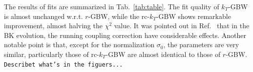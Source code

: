 \documentclass[11pt]{article}
\numberwithin{equation}{section}
\numberwithin{table}{section}
\numberwithin{figure}{section}
\newcommand{\comment}[1]{\texttt{\color{red}#1}}
\begin{document}
The results of fits are summarized in Tab.~\ref{tab:table}. 
The fit quality of $k_T$-GBW is almost unchanged w.r.t. $r$-GBW, while the rc-$k_T$-GBW shows remarkable improvement, almost halving the $\chi^2$ value.
It was pointed out in Ref.~\cite{Albacete:2004gw,Albacete:2007yr,Albacete:2010sy} that in the BK evolution, the running coupling correction have considerable effects.
Another notable point is that, except for the normalization $\sigma_0$, the parameters are very similar, particularly those of rc-$k_T$-GBW are almost identical to those of $r$-GBW. 
\comment{Describet what's in the figuers...} 
\end{document}
